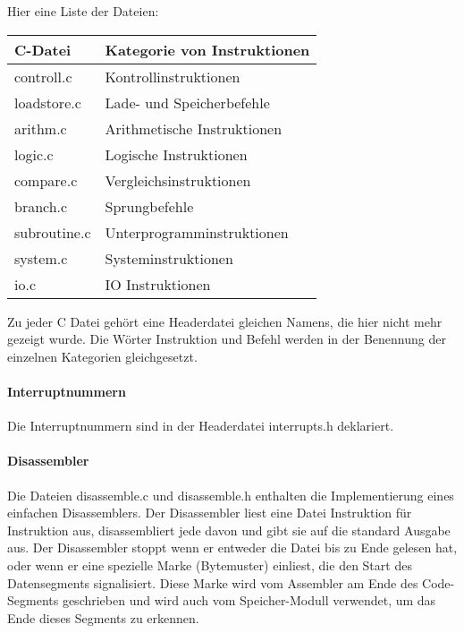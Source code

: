 Hier eine Liste der Dateien:

\begin{center}
\begin{tabular}{ll}
C-Datei      & Kategorie von Instruktionen \\
\hline\hline
controll.c   & Kontrollinstruktionen       \\
loadstore.c  & Lade- und Speicherbefehle   \\
arithm.c     & Arithmetische Instruktionen \\
logic.c      & Logische Instruktionen      \\
compare.c    & Vergleichsinstruktionen     \\
branch.c     & Sprungbefehle               \\
subroutine.c & Unterprogramminstruktionen  \\
system.c     & Systeminstruktionen         \\
io.c         & IO Instruktionen            \\
\hline
\end{tabular}
\end{center}

Zu jeder C Datei gehört eine Headerdatei gleichen Namens, die hier nicht mehr
gezeigt wurde. Die Wörter \glqq{}Instruktion\grqq{} und \glqq{}Befehl\grqq{}
werden in der Benennung der einzelnen Kategorien gleichgesetzt.

\paragraph{Interruptnummern}
Die Interruptnummern sind in der Headerdatei interrupts.h deklariert.



\paragraph{Disassembler}
Die Dateien disassemble.c und disassemble.h enthalten die Implementierung eines
einfachen Disassemblers. Der Disassembler liest eine Datei Instruktion für
Instruktion aus, disassembliert jede davon und gibt sie auf die standard
Ausgabe aus. Der Disassembler stoppt wenn er entweder die Datei bis zu Ende
gelesen hat, oder wenn er eine spezielle Marke (Bytemuster) einliest, die den
Start des Datensegments signalisiert. Diese Marke wird vom Assembler am Ende
des Code-Segments geschrieben und wird auch vom Speicher-Modull verwendet, um
das Ende dieses Segments zu erkennen.

